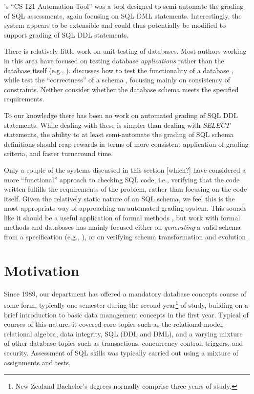 \documentclass[sigconf, authordraft, capitalise]{acmart}
\begin{document}
\citeauthor{Gong.A-2015a-CS-121-Automation}'s ``CS 121 Automation Tool'' \cite{Gong.A-2015a-CS-121-Automation} was a tool designed to semi-automate the grading of SQL assessments, again focusing on SQL DML statements. Interestingly, the system appears to be extensible and could thus potentially be modified to support grading of SQL DDL statements.

There is relatively little work on unit testing of databases. Most authors working in this area have focused on testing database \emph{applications} rather than the database itself (e.g., \cite{Binnig.C-2008a-Multi-RQP,Chays.D-2008a-Query-based,Marcozzi.M-2012a-Test,Haller.K-2010a-Test}). \citeauthor{Ambler.S-2006a-Database} discusses how to test the functionality of a database \cite{Ambler.S-2006a-Database}, while \citeauthor{Farre.C-2008a-SVTe} test the ``correctness'' of a schema \cite{Farre.C-2008a-SVTe}, focusing mainly on consistency of constraints. Neither consider whether the database schema meets the specified requirements.

To our knowledge there has been no work on automated grading of SQL DDL statements. While dealing with these is simpler than dealing with \emph{SELECT} statements, the ability to at least semi-automate the grading of SQL schema definitions should reap rewards in terms of more consistent application of grading criteria, and faster turnaround time.

Only a couple of the systems discussed in this section [which?] have considered a more ``functional'' approach to checking SQL code, i.e., verifying that the code written fulfills the requirements of the problem, rather than focusing on the code itself. Given the relatively static nature of an SQL schema, we feel this is the most appropriate way of approaching an automated grading system. This sounds like it should be a useful application of formal methods \cite{Spivey.J-1989a-An-introduction}, but work with formal methods and databases has mainly focused either on \emph{generating} a valid schema from a specification (e.g., \cite{Vatanawood.W-2004a-Formal,Lukovic.I-2003a-Proceedings,Choppella.V-2006a-Constructing}), or on verifying schema transformation and evolution \cite{Bench-Capon.T-1998a-Report}.


\section{Motivation}
\label{sec-motivation}

Since 1989, our department has offered a mandatory database concepts course of some form, typically one semester during the second year\footnote{New Zealand Bachelor's degrees normally comprise three years of study.} of study, building on a brief introduction to basic data management concepts in the first year. Typical of courses of this nature, it covered core topics such as the relational model, relational algebra, data integrity, SQL (DDL and DML), and a varying mixture of other database topics such as transactions, concurrency control, triggers, and security. Assessment of SQL skills was typically carried out using a mixture of assignments and tests.
\end{document}

